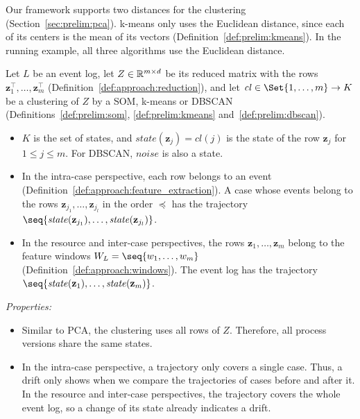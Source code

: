 Our framework supports two distances for the clustering (Section~\ref{sec:prelim:pca}). k-means only uses the Euclidean distance, since each of its centers is the mean of its vectors (Definition~\ref{def:prelim:kmeans}). In the running example, all three algorithms use the Euclidean distance.

\begin{definition}
	\label{def:approach:states}
	Let $L$ be an event log, let $Z \in \mathbb R^{m \times d}$ be its reduced matrix with the rows $\mathbf{z}_1^\top, \dots, \mathbf{z}_m^\top$ (Definition~\ref{def:approach:reduction}), and let $\mathit{cl} \in \Set{1, \dots, m} \to K$ be a clustering of $Z$ by a SOM, k-means or DBSCAN (Definitions~\ref{def:prelim:som}, \ref{def:prelim:kmeans} and~\ref{def:prelim:dbscan}).
	\begin{itemize}
		\item $K$ is the set of states, and $\mathit{state}(\mathbf{z}_j) = \mathit{cl}(j)$ is the state of the row $\mathbf{z}_j$ for $1 \le j \le m$. For DBSCAN, $\mathit{noise}$ is also a state.
		\item In the intra-case perspective, each row belongs to an event (Definition~\ref{def:approach:feature_extraction}). A case whose events belong to the rows $\mathbf{z}_{j_1}, \dots, \mathbf{z}_{j_l}$ in the order $\preceq$ has the trajectory $\seq{\mathit{state}(\mathbf{z}_{j_1}), \dots, \mathit{state}(\mathbf{z}_{j_l})}$.
		\item In the resource and inter-case perspectives, the rows $\mathbf{z}_1, \dots, \mathbf{z}_m$ belong to the feature windows $W_L = \seq{w_1, \dots, w_m}$ (Definition~\ref{def:approach:windows}). The event log has the trajectory $\seq{\mathit{state}(\mathbf{z}_1), \dots, \mathit{state}(\mathbf{z}_m)}$.
	\end{itemize}
\end{definition}

\noindent\emph{Properties:}
\begin{itemize}[beginpenalty=10000]
	\item Similar to PCA, the clustering uses all rows of $Z$. Therefore, all process versions share the same states.
	\item In the intra-case perspective, a trajectory only covers a single case. Thus, a drift only shows when we compare the trajectories of cases before and after it. In the resource and inter-case perspectives, the trajectory covers the whole event log, so a change of its state already indicates a drift.
\end{itemize}

